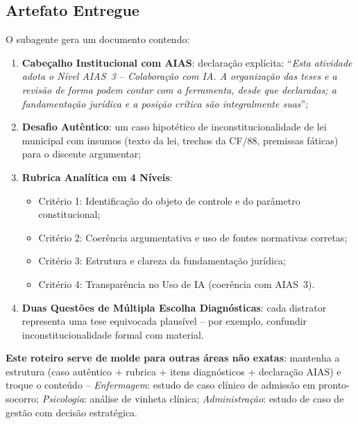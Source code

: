 \subsection{Artefato Entregue}
O subagente gera um documento contendo:
\begin{enumerate}
  \item \textbf{Cabe{\c c}alho Institucional com AIAS}: declara{\c c}{\~a}o expl{\'i}cita: ``\emph{Esta atividade adota o N{\'i}vel AIAS~3 -- Colabora{\c c}{\~a}o com IA. A organiza{\c c}{\~a}o das teses e a revis{\~a}o de forma podem contar com a ferramenta, desde que declaradas; a fundamenta{\c c}{\~a}o jur{\'i}dica e a posi{\c c}{\~a}o cr{\'i}tica s{\~a}o integralmente suas}'';
  \item \textbf{Desafio Aut{\^e}ntico}: um caso hipot{\'e}tico de inconstitucionalidade de lei municipal com insumos (texto da lei, trechos da CF/88, premissas f{\'a}ticas) para o discente argumentar;
  \item \textbf{Rubrica Anal{\'i}tica em 4 N{\'i}veis}:
    \begin{itemize}
      \item Crit{\'e}rio 1: Identifica{\c c}{\~a}o do objeto de controle e do par{\^a}metro constitucional;
      \item Crit{\'e}rio 2: Coer{\^e}ncia argumentativa e uso de fontes normativas corretas;
      \item Crit{\'e}rio 3: Estrutura e clareza da fundamenta{\c c}{\~a}o jur{\'i}dica;
      \item Crit{\'e}rio 4: Transpar{\^e}ncia no Uso de IA (coer{\^e}ncia com AIAS~3).
    \end{itemize}
  \item \textbf{Duas Quest{\~o}es de M{\'u}ltipla Escolha Diagn{\'o}sticas}: cada distrator representa uma tese equivocada plaus{\'i}vel -- por exemplo, confundir inconstitucionalidade formal com material.
\end{enumerate}

\begin{adaptacaoarea}
\textbf{Este roteiro serve de molde para outras {\'a}reas n{\~a}o exatas}: mantenha a estrutura (caso aut{\^e}ntico + rubrica + itens diagn{\'o}sticos + declara{\c c}{\~a}o AIAS) e troque o conte{\'u}do -- \emph{Enfermagem}: estudo de caso cl{\'i}nico de admiss{\~a}o em pronto-socorro; \emph{Psicologia}: an{\'a}lise de vinheta cl{\'i}nica; \emph{Administra{\c c}{\~a}o}: estudo de caso de gest{\~a}o com decis{\~a}o estrat{\'e}gica.
\end{adaptacaoarea}

